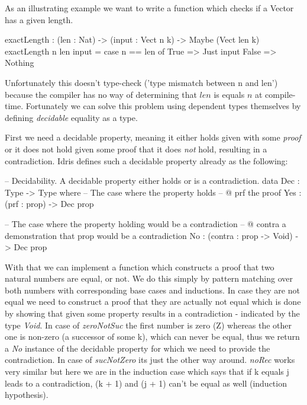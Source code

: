 As an illustrating example we want to write a function which checks if a Vector has a given length. 

\begin{HaskellCode}
exactLength : (len : Nat) -> (input : Vect n k) -> Maybe (Vect len k)
exactLength {n} len input = case n == len of
                                 True  => Just input 
                                 False => Nothing 
\end{HaskellCode}

Unfortunately this doesn't type-check ('type mismatch between n and len') because the compiler has no way of determining that $len$ is equals $n$ at compile-time. Fortunately we can solve this problem using dependent types themselves by defining \textit{decidable} equality as a type.

First we need a decidable property, meaning it either holds given with some \textit{proof} or it does not hold given some proof that it does \textit{not} hold, resulting in a contradiction. Idris defines such a decidable property already as the following:

\begin{HaskellCode}
-- Decidability. A decidable property either holds or is a contradiction.
data Dec : Type -> Type where
  -- The case where the property holds
  -- @ prf the proof
  Yes : (prf : prop) -> Dec prop

  -- The case where the property holding would be a contradiction
  -- @ contra a demonstration that prop would be a contradiction
  No  : (contra : prop -> Void) -> Dec prop
\end{HaskellCode}

With that we can implement a function which constructs a proof that two natural numbers are equal, or not. We do this simply by pattern matching over both numbers with corresponding base cases and inductions. In case they are not equal we need to construct a proof that they are actually not equal which is done by showing that given some property results in a contradiction - indicated by the type \textit{Void}. In case of \textit{zeroNotSuc} the first number is zero (Z) whereas the other one is non-zero (a successor of some k), which can never be equal, thus we return a \textit{No} instance of the decidable property for which we need to provide the contradiction. In case of \textit{sucNotZero} its just the other way around. \textit{noRec} works very similar but here we are in the induction case which says that if k equals j leads to a contradiction, (k + 1) and (j + 1) can't be equal as well (induction hypothesis).

